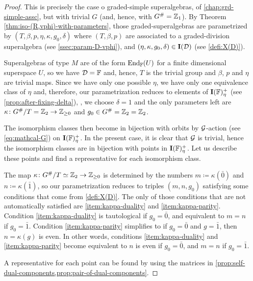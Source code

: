 \begin{proof}
    This is precisely the case o graded-simple superalgebras, of \cref{chap:grd-simple-assc}, but with trivial $G$ (and, hence, with $G^\# = \mathbb{Z}_1$). 
    By Theorem \ref{thm:iso-(R,vphi)-with-parameters}, those graded-superalgebras are parametrized by $(T, \beta, p, \eta, \kappa, g_0, \delta)$ where $(T, \beta, p)$ are associated to a graded-division superalgebra (see \cref{ssec:param-D-vphi}), and $(\eta, \kappa, g_0, \delta) \in \mathbf{I}(\mathcal{D})$ (see \cref{defi:X(D)}). 
    
    Superalgebras of type $M$ are of the form $\operatorname{End}_{\mathbb{F}} (U)$ for a finite dimensional superspace $U$, so we have $\mathcal{D} = \mathbb{F}$ and, hence, $T$ is the trivial group and $\beta$, $p$ and $\eta$ are trivial maps. 
    Since we have only one possible $\eta$, we have only one equivalence class of $\eta$ and, therefore, our parametrization reduces to elements of $\mathbf{I}(\mathbb{F})_\eta^+$ (see \cref{prop:after-fixing-delta}), \ie, we choose $\delta = 1$ and the only parameters left are $\kappa\colon G^\#/T = \mathbb{Z}_2 \to \mathbb{Z}_{\geq 0}$ and $g_0 \in G^\# = \mathbb{Z}_2 = \mathbb{Z}_2$. 
    
    The isomorphism classes then become in bijection with orbits by $\mathcal G$-action (see \cref{eq:mathcal-G}) on $\mathbf{I}(\mathbb{F})_\eta^+$. 
    In the present case, it is clear that $\mathcal G$ is trivial, hence the isomorphism classes are in bijection with points in $\mathbf{I}(\mathbb{F})_\eta^+$. 
    Let us describe these points and find a representative for each isomorphism class. 
    
    The map $\kappa\colon G^\#/T \simeq \mathbb{Z}_2 \to \mathbb{Z}_{\geq 0}$ is determined by the numbers $m \coloneqq \kappa(\bar 0)$ and $n \coloneqq \kappa(\bar 1)$, so our parametrization reduces to triples $(m,n,g_0)$ satisfying some conditions that come from \cref{defi:X(D)}. 
    The only of those conditions  that are not automatically satisfied are \eqref{item:kappa-duality} and \eqref{item:kappa-parity}. 
    Condition \eqref{item:kappa-duality} is tautological if $g_0 = \bar 0$, and equivalent to $m=n$ if $g_0 = \bar 1$. 
    Condition \eqref{item:kappa-parity} simplifies to if $g_0 = \bar 0$ and $g = \bar 1$, then $n = \kappa (g)$ is even. 
    In other words, conditions \eqref{item:kappa-duality} and \eqref{item:kappa-parity} become equivalent to $n$ is even if $g_0 = \bar 0$, and $m = n$ if $g_0= \bar 1$. 
    
    A representative for each point can be found by using the matrices in \cref{prop:self-dual-components,prop:pair-of-dual-components}. 
\end{proof}

